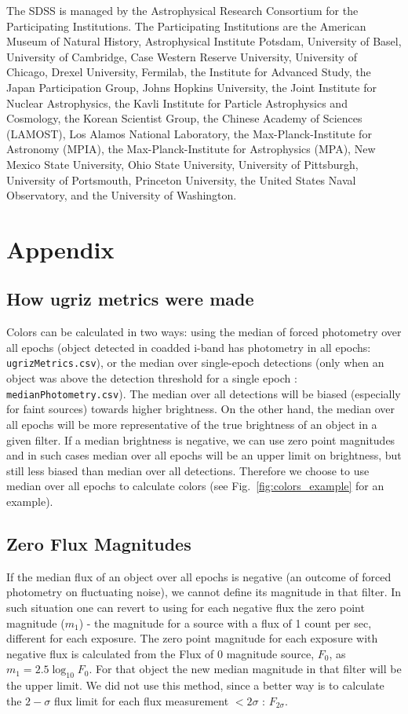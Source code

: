 \documentclass[fleqn,usenatbib]{mnras}  %
\begin{document}
The SDSS is managed by the Astrophysical Research Consortium for the Participating Institutions. The Participating Institutions are the American Museum of Natural History, Astrophysical Institute Potsdam, University of Basel, University of Cambridge, Case Western Reserve University, University of Chicago, Drexel University, Fermilab, the Institute for Advanced Study, the Japan Participation Group, Johns Hopkins University, the Joint Institute for Nuclear Astrophysics, the Kavli Institute for Particle Astrophysics and Cosmology, the Korean Scientist Group, the Chinese Academy of Sciences (LAMOST), Los Alamos National Laboratory, the Max-Planck-Institute for Astronomy (MPIA), the Max-Planck-Institute for Astrophysics (MPA), New Mexico State University, Ohio State University, University of Pittsburgh, University of Portsmouth, Princeton University, the United States Naval Observatory, and the University of Washington. 

\section{Appendix}

\subsection{How ugriz metrics were made}
Colors can be calculated in two ways: using the median of forced photometry over all epochs (object detected in coadded i-band has photometry in all epochs:  \verb|ugrizMetrics.csv|), or the median over single-epoch detections (only when an object was above the detection threshold for a single epoch : \verb|medianPhotometry.csv|).  
The median over all detections will be biased (especially for faint sources) towards higher brightness.  On the other hand, the median over all epochs will be more representative of the true brightness of an object in a given filter.  If a median brightness is negative, we can use zero point magnitudes and in such cases median over all epochs will be an upper limit on brightness, but still less biased than median over all detections. Therefore  we choose to use median over all epochs to calculate colors (see Fig.~\ref{fig:colors_example} for an example).  

\subsection{Zero Flux Magnitudes}

If the median flux of an object over all epochs  is negative (an outcome of forced photometry on fluctuating noise), we cannot define its magnitude in that filter.  In such situation one can revert to  using for each negative flux the zero point magnitude ($m_1$) - the magnitude for a source with a flux of 1 count per sec, different for each exposure.  The zero point magnitude for each exposure with negative flux is calculated from the  Flux of 0 magnitude source,  $F_0$,  as  $m_{1} = 2.5 \log_{10}{F_{0}}$. For that object the new median magnitude in that filter will be the upper limit. We did not use this method, since a better way is to calculate the $2-\sigma$ flux limit for each flux measurement $< 2 \sigma$ : $F_{2\sigma}$. 
\end{document}
